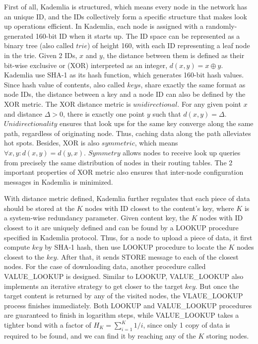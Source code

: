 First of all, Kademlia is structured, which means every node in the network has an unique ID, and the IDs collectively form a specific structure that makes look up operations efficient. In Kademlia, each node is assigned with a randomly-generated 160-bit ID when it starts up. The ID space can be represented as a binary tree (also called $trie$) of height 160, with each ID representing a leaf node in the trie. Given 2 IDs, $x$ and $y$, the distance between them is defined as their bit-wise exclusive or (XOR) interpreted as an integer, $d(x,y)=x \oplus y$. Kademlia use SHA-1 as its hash function, which generates 160-bit hash values. Since hash value of contents, also called $keys$, share exactly the same format as node IDs, the distance between a key and a node ID can also be defined by the XOR metric. The XOR distance metric is $unidirectional$. For any given point $x$ and distance $\Delta>0$, there is exactly one point $y$ such that $d(x,y)=\Delta$. $Unidirectionality$ ensures that look ups for the same key converge along the same path, regardless of originating node. Thus, caching data along the path alleviates hot spots. Besides, XOR is also $symmetric$, which means $\forall x, y: d(x,y)=d(y,x)$. $Symmetry$ allows nodes to receive look up queries from precisely the same distribution of nodes in their routing tables. The 2 important properties of XOR metric also ensures that inter-node configuration messages in Kademlia is minimized.

With distance metric defined, Kademlia further regulates that each piece of data should be stored at the $K$ nodes with ID closest to the content's key, where $K$ is a system-wise redundancy parameter. Given content key, the $K$ nodes with ID closest to it are uniquely defined and can be found by a LOOKUP procedure specified in Kademlia protocol. Thus, for a node to upload a piece of data, it first compute $key$ by SHA-1 hash, then use LOOKUP procedure to locate the $K$ nodes closest to the $key$. After that, it sends STORE message to each of the closest nodes. For the case of downloading data, another procedure called VALUE\_LOOKUP is designed. Similar to LOOKUP, VALUE\_LOOKUP also implements an iterative strategy to get closer to the target $key$. But once the target content is returned by any of the visited nodes, the VLAUE\_LOOKUP process finishes immediately. Both LOOKUP and VALUE\_LOOKUP procedures are guaranteed to finish in logarithm steps, while VALUE\_LOOKUP takes a tighter bond with a factor of $H_K = \sum_{i=1}^{K} 1/i$, since only 1 copy of data is required to be found, and we can find it by reaching any of the $K$ storing nodes\cite{cai2013probabilistic}.

